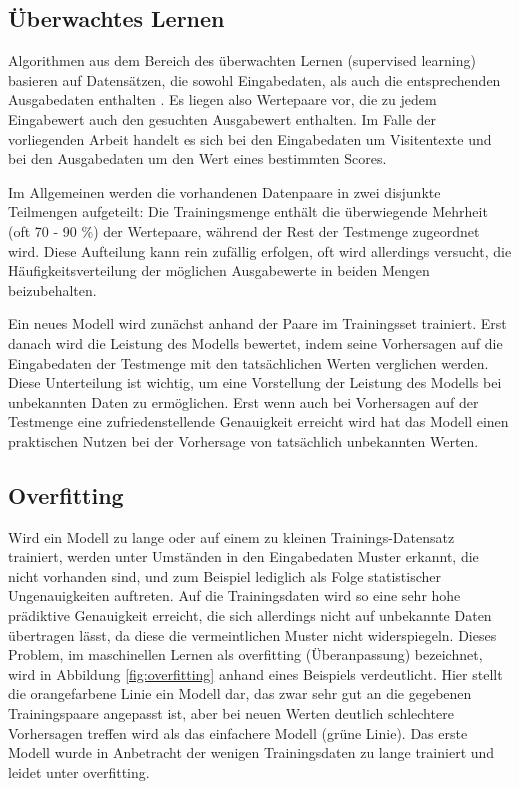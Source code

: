 \subsection{Überwachtes Lernen}\label{section:supervised_learning}

Algorithmen aus dem Bereich des überwachten Lernen (supervised learning) basieren auf Datensätzen, die sowohl Eingabedaten, als auch die entsprechenden Ausgabedaten enthalten \citep{russellArtificialIntelligenceModern2020}. Es liegen also Wertepaare vor, die zu jedem Eingabewert auch den gesuchten Ausgabewert enthalten. Im Falle der vorliegenden Arbeit handelt es sich bei den Eingabedaten um Visitentexte und bei den Ausgabedaten um den Wert eines bestimmten Scores. 

Im Allgemeinen werden die vorhandenen Datenpaare in zwei disjunkte Teilmengen aufgeteilt: Die Trainingsmenge enthält die überwiegende Mehrheit (oft 70 - 90 \%) der Wertepaare, während der Rest der Testmenge zugeordnet wird. Diese Aufteilung kann rein zufällig erfolgen, oft wird allerdings versucht, die Häufigkeitsverteilung der möglichen Ausgabewerte in beiden Mengen beizubehalten.

Ein neues Modell wird zunächst anhand der Paare im Trainingsset trainiert. Erst danach wird die Leistung des Modells bewertet, indem seine Vorhersagen auf die Eingabedaten der Testmenge mit den tatsächlichen Werten verglichen werden. Diese Unterteilung ist wichtig, um eine Vorstellung der Leistung des Modells bei unbekannten Daten zu ermöglichen. Erst wenn auch bei Vorhersagen auf der Testmenge eine zufriedenstellende Genauigkeit erreicht wird hat das Modell einen praktischen Nutzen bei der Vorhersage von tatsächlich unbekannten Werten.

\subsection{Overfitting}
Wird ein Modell zu lange oder auf einem zu kleinen Trainings-Datensatz trainiert, werden unter Umständen in den Eingabedaten Muster erkannt, die nicht vorhanden sind, und zum Beispiel lediglich als Folge statistischer Ungenauigkeiten auftreten. Auf die Trainingsdaten wird so eine sehr hohe prädiktive Genauigkeit erreicht, die sich allerdings nicht auf unbekannte Daten übertragen lässt, da diese die vermeintlichen Muster nicht widerspiegeln. Dieses Problem, im maschinellen Lernen als overfitting (Überanpassung) bezeichnet, wird in Abbildung \ref{fig:overfitting} anhand eines Beispiels verdeutlicht. Hier stellt die orangefarbene Linie ein Modell dar, das zwar sehr gut an die gegebenen Trainingspaare angepasst ist, aber bei neuen Werten deutlich schlechtere Vorhersagen treffen wird als das einfachere Modell (grüne Linie). Das erste Modell wurde in Anbetracht der wenigen Trainingsdaten zu lange trainiert und leidet unter overfitting.

